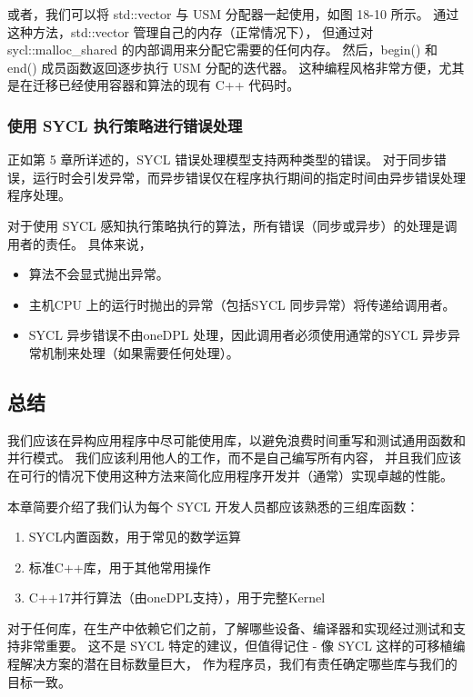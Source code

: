 或者，我们可以将 std::vector 与 USM 分配器一起使用，如图 18-10 所示。 
通过这种方法，std::vector 管理自己的内存（正常情况下），
但通过对 sycl::malloc\_shared 的内部调用来分配它需要的任何内存。 
然后，begin() 和 end() 成员函数返回逐步执行 USM 分配的迭代器。 
这种编程风格非常方便，尤其是在迁移已经使用容器和算法的现有 C++ 代码时。

\subsubsection{使用 SYCL 执行策略进行错误处理}
正如第 5 章所详述的，SYCL 错误处理模型支持两种类型的错误。 
对于同步错误，运行时会引发异常，而异步错误仅在程序执行期间的指定时间由异步错误处理程序处理。

对于使用 SYCL 感知执行策略执行的算法，所有错误（同步或异步）的处理是调用者的责任。 具体来说，

\begin{itemize}
	\item 算法不会显式抛出异常。

	\item 主机CPU 上的运行时抛出的异常（包括SYCL 同步异常）将传递给调用者。

	\item SYCL 异步错误不由oneDPL 处理，因此调用者必须使用通常的SYCL 异步异常机制来处理（如果需要任何处理）。
\end{itemize}

\subsection{总结}
我们应该在异构应用程序中尽可能使用库，以避免浪费时间重写和测试通用函数和并行模式。 
我们应该利用他人的工作，而不是自己编写所有内容，
并且我们应该在可行的情况下使用这种方法来简化应用程序开发并（通常）实现卓越的性能。

本章简要介绍了我们认为每个 SYCL 开发人员都应该熟悉的三组库函数：

\begin{enumerate}
	\item SYCL内置函数，用于常见的数学运算

	\item 标准C++库，用于其他常用操作

	\item C++17并行算法（由oneDPL支持），用于完整Kernel
\end{enumerate}

对于任何库，在生产中依赖它们之前，了解哪些设备、编译器和实现经过测试和支持非常重要。 
这不是 SYCL 特定的建议，但值得记住 - 像 SYCL 这样的可移植编程解决方案的潜在目标数量巨大，
作为程序员，我们有责任确定哪些库与我们的目标一致。